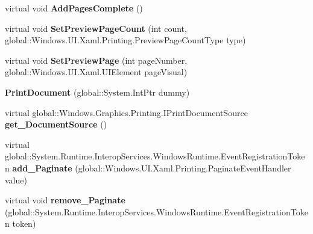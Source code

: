 \begin{DoxyCompactItemize}
virtual void {\bfseries Add\+Pages\+Complete} ()
\item 
\mbox{\label{class_windows_1_1_u_i_1_1_xaml_1_1_printing_1_1_print_document_acdb1e1f03c6ad6617b2045feee076bb1}} 
virtual void {\bfseries Set\+Preview\+Page\+Count} (int count, global\+::\+Windows.\+U\+I.\+Xaml.\+Printing.\+Preview\+Page\+Count\+Type type)
\item 
\mbox{\label{class_windows_1_1_u_i_1_1_xaml_1_1_printing_1_1_print_document_a9b89dc73b3d3108f6a9a5bbda7805863}} 
virtual void {\bfseries Set\+Preview\+Page} (int page\+Number, global\+::\+Windows.\+U\+I.\+Xaml.\+U\+I\+Element page\+Visual)
\item 
\mbox{\label{class_windows_1_1_u_i_1_1_xaml_1_1_printing_1_1_print_document_ac0c6ca7b864f685e2f0989f778c41e72}} 
{\bfseries Print\+Document} (global\+::\+System.\+Int\+Ptr dummy)
\item 
\mbox{\label{class_windows_1_1_u_i_1_1_xaml_1_1_printing_1_1_print_document_a58bc53aad6d052d4b2a25935ba3f7844}} 
virtual global\+::\+Windows.\+Graphics.\+Printing.\+I\+Print\+Document\+Source {\bfseries get\+\_\+\+Document\+Source} ()
\item 
\mbox{\label{class_windows_1_1_u_i_1_1_xaml_1_1_printing_1_1_print_document_a9c15072b2efeea170b01106af19c20d2}} 
virtual global\+::\+System.\+Runtime.\+Interop\+Services.\+Windows\+Runtime.\+Event\+Registration\+Token {\bfseries add\+\_\+\+Paginate} (global\+::\+Windows.\+U\+I.\+Xaml.\+Printing.\+Paginate\+Event\+Handler value)
\item 
\mbox{\label{class_windows_1_1_u_i_1_1_xaml_1_1_printing_1_1_print_document_af8447e29ab1c6aeff221a7ecf57c48a5}} 
virtual void {\bfseries remove\+\_\+\+Paginate} (global\+::\+System.\+Runtime.\+Interop\+Services.\+Windows\+Runtime.\+Event\+Registration\+Token token)
\item 
\mbox{\label{class_windows_1_1_u_i_1_1_xaml_1_1_printing_1_1_print_document_a7f3e8c94058352a6d36e6c86a1f14425}} 

\end{DoxyCompactItemize}
